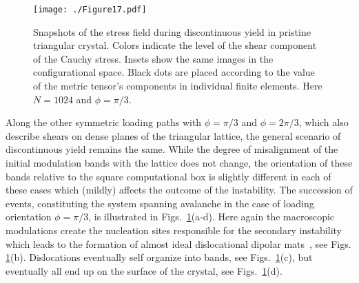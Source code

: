 \documentclass[CRPHYS,Unicode,manuscript]{cedram}
\begin{document}
\begin{figure}[h!]
\centering
\texttt{[image: ./Figure17.pdf]}
\caption{\scriptsize {Snapshots of the stress field during discontinuous yield in pristine triangular  crystal. Colors indicate the level of the  shear component of the Cauchy stress. Insets show the same images in the configurational space.  Black dots are placed according to the value of the  metric tensor's components in individual finite elements.
Here $N=1024$ and $\phi=\pi/3$.  }
 \label{fig:th60hex}}
\end{figure}
 
Along  the other symmetric loading paths with $\phi =\pi/3$ and $\phi =2\pi/3$, which also describe  shears on  dense planes of the triangular lattice, the general scenario of discontinuous yield remains  the same. While the degree of misalignment of the  initial modulation bands with the lattice does not change,
the orientation of these bands relative to the square computational box is slightly different in each of these cases which (mildly) affects the outcome of the instability. The succession of events, constituting the system spanning avalanche  in the case of  loading orientation  $\phi=\pi/3$, is illustrated in  Figs.~\ref{fig:th60hex}(a-d). Here again  the macroscopic  modulations create the nucleation sites responsible for   the secondary instability which leads to the formation of almost ideal dislocational dipolar mats~\cite{Hansen1986-rs}, see  Figs. \ref{fig:th60hex}(b).  Dislocations eventually self organize into bands, see  Figs.~\ref{fig:th60hex}(c), but eventually all end up on the surface of the crystal, see  Figs.~\ref{fig:th60hex}(d).  
\end{document}
